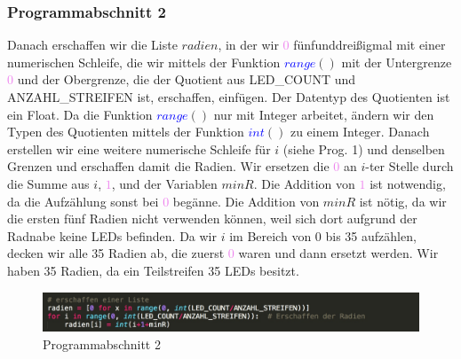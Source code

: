 \documentclass [a4paper, 11pt] {article}
\begin{document}
\subsubsection{Programmabschnitt 2}
Danach erschaffen wir die Liste {$radien$}, in der wir \textcolor{violet}{$0$} fünfunddreißigmal mit einer numerischen Schleife, die wir mittels der Funktion \textcolor{blue}{$range$}{$()$} mit der Untergrenze \textcolor{violet}{$0$} und der Obergrenze, die der Quotient aus LED\_COUNT und ANZAHL\_STREIFEN ist, erschaffen, einfügen. Der Datentyp des Quotienten ist ein Float. Da die Funktion \textcolor{blue}{$range$}{$()$} nur mit Integer arbeitet, ändern wir den Typen des Quotienten mittels der Funktion \textcolor{blue}{$int$}{$()$} zu einem Integer. Danach erstellen wir eine weitere numerische Schleife für {$i$} (siehe Prog. 1) und denselben Grenzen und erschaffen damit die Radien. Wir ersetzen die \textcolor{violet}{$0$} an {$i$}-ter Stelle durch die Summe aus {$i$}, \textcolor{violet}{$1$}, und der Variablen {$minR$}. Die Addition von \textcolor{violet}{$1$} ist notwendig, da die Aufzählung sonst bei \textcolor{violet}{$0$} begänne. Die Addition von {$minR$} ist nötig, da wir die ersten fünf Radien nicht verwenden können, weil sich dort aufgrund der Radnabe keine LEDs befinden. 
Da wir {$i$} im Bereich von 0 bis 35 aufzählen, decken wir alle 35 Radien ab, die zuerst \textcolor{violet}{$0$} waren und dann ersetzt werden. Wir haben 35 Radien, da ein Teilstreifen 35 LEDs besitzt.
\begin{figure}[h]
	\centering
	\includegraphics[width=16cm]{P2.png}
	\caption{Programmabschnitt 2}
\end{figure}
\newpage
\end{document}
